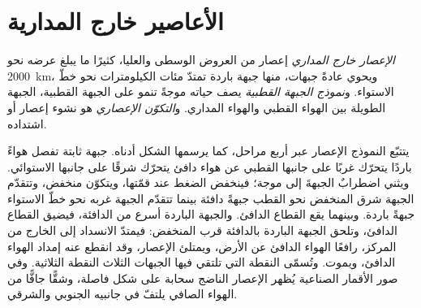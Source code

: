 \section{الأعاصير خارج المدارية}\label{sec:b2:weather-systems:cyclones}

\begin{definition}\label{def:b2:weather-systems:cyclones}
\emph{الإعصار خارج المداري} إعصار من العروض الوسطى
والعليا، كثيرًا ما يبلغ عرضه نحو \qty{2000}{km}، ويحوي عادةً جبهات، منها جبهة باردة تمتدّ
مئات الكيلومترات نحو خطّ الاستواء. و\emph{نموذج الجبهة القطبية}
يصف حياته موجةً تنمو على الجبهة القطبية، الجبهة الطويلة بين الهواء القطبي
والهواء المداري. و\emph{التكوّن الإعصاري} هو نشوء
إعصار أو اشتداده.
\end{definition}

يتتبّع النموذج الإعصار عبر أربع مراحل، كما يرسمها الشكل أدناه. جبهة ثابتة
تفصل هواءً باردًا يتحرّك غربًا على جانبها القطبي عن هواء دافئ يتحرّك شرقًا على جانبها
الاستوائي. ويثني اضطرابٌ الجبهةَ إلى موجة؛ فينخفض الضغط عند قمّتها، ويتكوّن
منخفض، وتتقدّم الجبهة شرق المنخفض نحو القطب جبهةً دافئة بينما تتقدّم الجبهة غربه
نحو خطّ الاستواء جبهةً باردة. وبينهما يقع القطاع الدافئ. والجبهة الباردة
أسرع من الدافئة، فيضيق القطاع الدافئ، وتلحق الجبهة الباردة بالدافئة
قرب المنخفض: فيمتدّ الانسداد إلى الخارج من المركز، رافعًا الهواء الدافئ عن
الأرض، ويمتلئ الإعصار، وقد انقطع عنه إمداد الهواء الدافئ، ويموت. وتُسمّى النقطة التي
تلتقي فيها الجبهات الثلاث النقطة الثلاثية. وفي صور الأقمار الصناعية يُظهر الإعصار الناضج
سحابة على شكل فاصلة، وشقًّا جافًّا من الهواء الصافي يلتفّ في جانبيه الجنوبي والشرقي.

